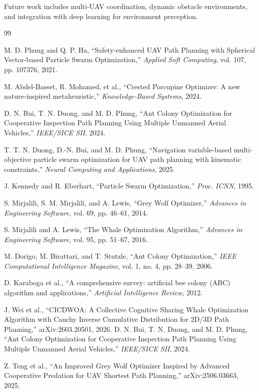 \documentclass[12pt,a4paper]{article}
\begin{document}
Future work includes multi-UAV coordination, dynamic obstacle environments, 
and integration with deep learning for environment perception.


\begin{thebibliography}{99}

M. D. Phung and Q. P. Ha, 
``Safety-enhanced UAV Path Planning with Spherical Vector-based Particle Swarm Optimization,''
\textit{Applied Soft Computing}, vol. 107, pp. 107376, 2021.

M. Abdel-Basset, R. Mohamed, et al.,
``Crested Porcupine Optimizer: A new nature-inspired metaheuristic,''
\textit{Knowledge-Based Systems}, 2024.

D. N. Bui, T. N. Duong, and M. D. Phung,
``Ant Colony Optimization for Cooperative Inspection Path Planning 
Using Multiple Unmanned Aerial Vehicles,''
\textit{IEEE/SICE SII}, 2024.

T. T. N. Duong, D.-N. Bui, and M. D. Phung,
``Navigation variable-based multi-objective particle swarm optimization 
for UAV path planning with kinematic constraints,''
\textit{Neural Computing and Applications}, 2025.

J. Kennedy and R. Eberhart,
``Particle Swarm Optimization,''
\textit{Proc. ICNN}, 1995.

S. Mirjalili, S. M. Mirjalili, and A. Lewis,
``Grey Wolf Optimizer,''
\textit{Advances in Engineering Software}, vol. 69, pp. 46--61, 2014.

S. Mirjalili and A. Lewis,
``The Whale Optimization Algorithm,''
\textit{Advances in Engineering Software}, vol. 95, pp. 51--67, 2016.

M. Dorigo, M. Birattari, and T. Stutzle,
``Ant Colony Optimization,''
\textit{IEEE Computational Intelligence Magazine}, vol. 1, no. 4, pp. 28--39, 2006.

D. Karaboga et al.,
``A comprehensive survey: artificial bee colony (ABC) algorithm and applications,''
\textit{Artificial Intelligence Review}, 2012.

J. Wei et al.,
``CICDWOA: A Collective Cognitive Sharing Whale Optimization Algorithm 
with Cauchy Inverse Cumulative Distribution for 2D/3D Path Planning,''
arXiv:2603.20501, 2026.
D. N. Bui, T. N. Duong, and M. D. Phung,
``Ant Colony Optimization for Cooperative Inspection Path Planning 
Using Multiple Unmanned Aerial Vehicles,''
\textit{IEEE/SICE SII}, 2024.

Z. Teng et al.,
``An Improved Grey Wolf Optimizer Inspired by Advanced Cooperative Predation 
for UAV Shortest Path Planning,''
arXiv:2506.03663, 2025.

\end{thebibliography}
\end{document}
